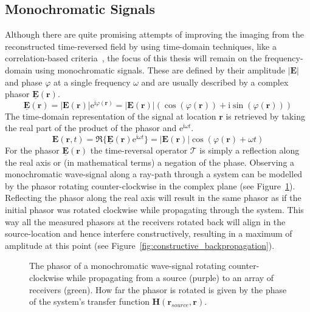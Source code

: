 \subsection{Monochromatic Signals}
Although there are quite promising attempts of improving the imaging from the reconstructed time-reversed field by using time-domain techniques, like a correlation-based criteria~\parencite{li_correlation-based_2021}, the focus of this thesis will remain on the frequency-domain using monochromatic signals.
These are defined by their amplitude \(|\bm{E}|\) and phase \(\varphi \) at a single frequency \(\omega \) and are usually described by a complex phasor \(\underline{\bm{E}}(\bm{r})\).
\begin{equation}
    \underline{\bm{E}}(\bm{r}) = |\bm{E}(\bm{r})| \mathrm{e}^{\mathrm{i} \varphi(\bm{r})} = |\bm{E}(\bm{r})| (\cos(\varphi(\bm{r})) + \mathrm{i} \sin(\varphi(\bm{r})))
\end{equation}
The time-domain representation of the signal at location \(\bm{r}\) is retrieved by taking the real part of the product of the phasor and \(\mathrm{e}^{\mathrm{i} \omega t}\).
\begin{equation}
    \bm{E}(\bm{r}, t) = \Re \{\underline{\bm{E}}(\bm{r}) \mathrm{e}^{\mathrm{i} \omega t}\} = |\bm{E}(\bm{r})| \cos(\varphi(\bm{r}) + \omega t)
\end{equation}
For the phasor \(\underline{\bm{E}}(\bm{r})\) the time-reversal operator \(\mathcal{T}\) is simply a reflection along the real axis or (in mathematical terms) a negation of the phase.
Observing a monochromatic wave-signal along a ray-path through a system can be modelled by the phasor rotating counter-clockwise in the complex plane (see Figure~\ref{fig:phasor_propagation}).
Reflecting the phasor along the real axis will result in the same phasor as if the initial phasor was rotated clockwise while propagating through the system.
This way all the measured phasors at the receivers rotated back will align in the source-location and hence interfere constructively, resulting in a maximum of amplitude at this point (see Figure~\ref{fig:constructive_backpropagation}).  

\begin{figure}
    \centering
    \def\svgwidth{0.8\textwidth}
    
    \caption{The phasor of a monochromatic wave-signal rotating counter-clockwise while propagating from a source (purple) to an array of receivers (green). How far the phasor is rotated is given by the phase of the system's transfer function \(\bm{H}(\bm{r}_{source}, \bm{r})\).}\label{fig:phasor_propagation}
\end{figure}

